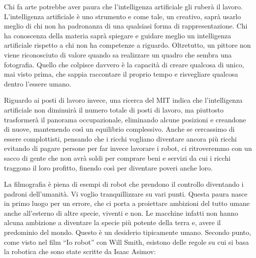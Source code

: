 \documentclass[12pt]{book} %
\begin{document}
Chi fa arte potrebbe aver paura che l'intelligenza artificiale gli ruberà il lavoro. L'intelligenza artificiale è uno strumento e come tale, un creativo, saprà usarlo meglio di chi non ha padronanza di una qualsiasi forma di rappresentazione. Chi ha conoscenza della materia saprà spiegare e guidare meglio un intelligenza artificiale rispetto a chi non ha competenze a riguardo. Oltretutto, un pittore non viene riconosciuto di valore quando sa realizzare un quadro che sembra una fotografia. Quello che colpisce davvero è la capacità di creare qualcosa di unico, mai visto prima, che sappia raccontare il proprio tempo e risvegliare qualcosa dentro l'essere umano.

Riguardo ai posti di lavoro invece, una ricerca del MIT indica che l'intelligenza artificiale non diminuirà il numero totale di posti di lavoro, ma piuttosto trasformerà il panorama occupazionale, eliminando alcune posizioni e creandone di nuove, mantenendo così un equilibrio complessivo.
Anche se cercassimo di essere complottisti, pensando che i ricchi vogliano diventare ancora più ricchi evitando di pagare persone per far invece lavorare i robot, ci ritroveremmo con un sacco di gente che non avrà soldi per comprare beni e servizi da cui i ricchi traggono il loro profitto, finendo così per diventare poveri anche loro.

La filmografia è piena di esempi di robot che prendono il controllo
diventando i padroni dell'umanità. Vi voglio tranquillizzare su vari punti. Questa paura nasce in
primo luogo per un errore, che ci porta a proiettare ambizioni del tutto umane anche all'esterno
di altre specie, viventi e non. Le macchine infatti non hanno alcuna ambizione a diventare la specie più potente della
terra e, avere il predominio del mondo. Questo è un desiderio tipicamente umano. Secondo punto, come visto nel film “Io
robot” con Will Smith, esistono delle regole su cui si basa la robotica che sono state scritte da Isaac Asimov:
\end{document}
